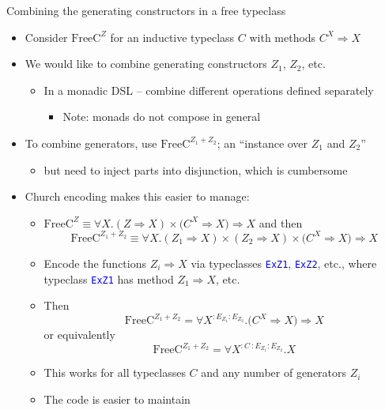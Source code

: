 \documentclass[english,,russian]{beamer}
\begin{document}
\begin{frame}{Combining the generating constructors in a free typeclass}
\begin{itemize}
\item Consider $\text{FreeC}^{Z}$ for an inductive typeclass $C$ with
methods $C^{X}\Rightarrow X$
\item We would like to combine generating constructors $Z_{1}$, $Z_{2}$,
etc.
\begin{itemize}
\item In a monadic DSL -- combine different operations defined separately
\begin{itemize}
\item Note: monads do not compose in general
\end{itemize}
\end{itemize}
\item To combine generators, use $\text{FreeC}^{Z_{1}+Z_{2}}$; an ``instance
over $Z_{1}$ and $Z_{2}$''
\begin{itemize}
\item but need to inject parts into disjunction, which is cumbersome
\end{itemize}
\item Church encoding makes this easier to manage:
\begin{itemize}
\item {\footnotesize{}$\text{FreeC}^{Z}\equiv\forall X.\left(Z\Rightarrow X\right)\times\big(C^{X}\Rightarrow X\big)\Rightarrow X$}
and then {\footnotesize{}
\[
\text{FreeC}^{Z_{1}+Z_{2}}\equiv\forall X.\left(Z_{1}\Rightarrow X\right)\times\left(Z_{2}\Rightarrow X\right)\times\big(C^{X}\Rightarrow X\big)\Rightarrow X
\]
}{\footnotesize\par}
\item Encode the functions $Z_{i}\Rightarrow X$ via typeclasses \texttt{\textcolor{blue}{\footnotesize{}ExZ1}},
\texttt{\textcolor{blue}{\footnotesize{}ExZ2}}, etc., where typeclass
\texttt{\textcolor{blue}{\footnotesize{}ExZ1}} has method $Z_{1}\Rightarrow X$,
etc.
\item Then {\footnotesize{}
\[
\text{FreeC}^{Z_{1}+Z_{2}}=\forall X^{:E_{Z_{1}}:E_{Z_{2}}}.\big(C^{X}\Rightarrow X\big)\Rightarrow X
\]
}or equivalently{\footnotesize{}
\[
\text{FreeC}^{Z_{1}+Z_{2}}=\forall X^{:C~:E_{Z_{1}}:E_{Z_{2}}}.X
\]
}{\footnotesize\par}
\item This works for all typeclasses $C$ and any number of generators $Z_{i}$
\item The code is easier to maintain
\end{itemize}
\end{itemize}
\end{frame}
\end{document}
